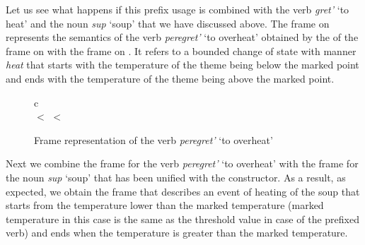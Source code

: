 Let us see what happens if this prefix usage is combined with the verb \textit{gret'} `to heat' and the noun \textit{sup} `soup' that we have discussed above. The frame on  represents the semantics of the verb \textit{peregret'} `to overheat' obtained by the  of the frame on  with the frame on . It refers to a bounded change of state with manner \textit{heat} that starts with the temperature of the theme being below the marked point and ends with the temperature of the theme being above the marked point.

\begin{figure}
\begin{center}
\begin{tabular}{c}
\\
 $<$  $<$ 
\end{tabular}
\end{center}
\caption{Frame representation of the verb \textit{peregret'} `to overheat' \label{frame:pere:gret}}
\end{figure}

Next we combine the frame for the verb \textit{peregret'} `to overheat' with the frame for the noun \textit{sup} `soup' that has been unified with the  constructor. As a result, as expected, we obtain the frame that describes an event of heating of the soup that starts from the temperature lower than the marked temperature (marked temperature in this case is the same as the threshold value in case of the prefixed verb) and ends when the temperature is greater than the marked temperature.

